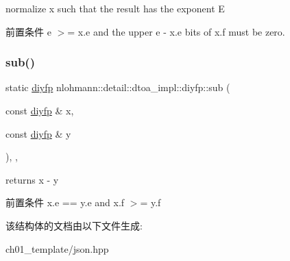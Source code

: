 normalize x such that the result has the exponent E 

\begin{DoxyPrecond}{前置条件}
e $>$= x.\+e and the upper e -\/ x.\+e bits of x.\+f must be zero. 
\end{DoxyPrecond}
\mbox{\label{structnlohmann_1_1detail_1_1dtoa__impl_1_1diyfp_aeb26771af54ad73598c1a0430d65d884}} 
\subsubsection{\texorpdfstring{sub()}{sub()}}
{\footnotesize\ttfamily static \mbox{\hyperlink{structnlohmann_1_1detail_1_1dtoa__impl_1_1diyfp}{diyfp}} nlohmann\+::detail\+::dtoa\+\_\+impl\+::diyfp\+::sub (\begin{DoxyParamCaption}\item[{const \mbox{\hyperlink{structnlohmann_1_1detail_1_1dtoa__impl_1_1diyfp}{diyfp}} \&}]{x,  }\item[{const \mbox{\hyperlink{structnlohmann_1_1detail_1_1dtoa__impl_1_1diyfp}{diyfp}} \&}]{y }\end{DoxyParamCaption})\hspace{0.3cm}{\ttfamily [inline]}, {\ttfamily [static]}, {\ttfamily [noexcept]}}



returns x -\/ y 

\begin{DoxyPrecond}{前置条件}
x.\+e == y.\+e and x.\+f $>$= y.\+f 
\end{DoxyPrecond}


该结构体的文档由以下文件生成\+:\begin{DoxyCompactItemize}
\item 
ch01\+\_\+template/json.\+hpp\end{DoxyCompactItemize}
